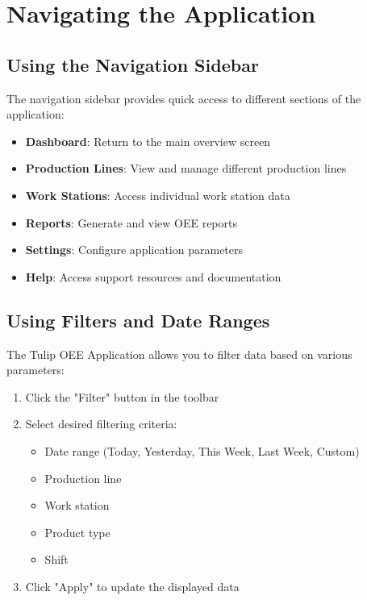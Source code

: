 \documentclass[12pt,a4paper]{report}
\begin{document}
\section{Navigating the Application}

\subsection{Using the Navigation Sidebar}

The navigation sidebar provides quick access to different sections of the application:

\begin{itemize}
    \item \textbf{Dashboard}: Return to the main overview screen
    \item \textbf{Production Lines}: View and manage different production lines
    \item \textbf{Work Stations}: Access individual work station data
    \item \textbf{Reports}: Generate and view OEE reports
    \item \textbf{Settings}: Configure application parameters
    \item \textbf{Help}: Access support resources and documentation
\end{itemize}

\subsection{Using Filters and Date Ranges}

The Tulip OEE Application allows you to filter data based on various parameters:

\begin{enumerate}
    \item Click the "Filter" button in the toolbar
    \item Select desired filtering criteria:
    \begin{itemize}
        \item Date range (Today, Yesterday, This Week, Last Week, Custom)
        \item Production line
        \item Work station
        \item Product type
        \item Shift
    \end{itemize}
    \item Click "Apply" to update the displayed data
\end{enumerate}
\end{document}
